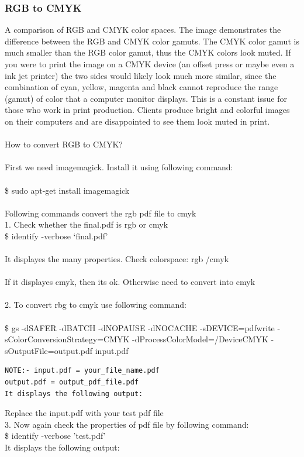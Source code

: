\subsubsection{RGB to CMYK}
\hspace{-1.8em} A comparison of RGB and CMYK color spaces. The image demonstrates the difference between the RGB and CMYK color gamuts. The CMYK color gamut is much smaller than the RGB color gamut, thus the CMYK colors look muted. If you were to print the image on a CMYK device (an offset press or maybe even a ink jet printer) the two sides would likely look much more similar, since the combination of cyan, yellow, magenta and black cannot reproduce the range (gamut) of color that a computer monitor displays. This is a constant issue for those who work in print production. Clients produce bright and colorful images on their computers and are disappointed to see them look muted in print.\\\\
How to convert RGB to CMYK?\\\\
First we need imagemagick. Install it using following command:\\\\
\$ sudo apt-get install imagemagick\\\\
Following commands convert the rgb pdf file  to cmyk\\
1. Check whether the final.pdf is rgb or cmyk\\
\$ identify -verbose ‘final.pdf’\\\\
It displayes the many properties. Check colorspace: rgb /cmyk\\
\\
If it displayes cmyk, then its ok. Otherwise need to convert into cmyk\\\\
2. To convert rbg to cmyk use following command:\\\\
\$ gs -dSAFER -dBATCH -dNOPAUSE -dNOCACHE -sDEVICE=pdfwrite -sColorConversionStrategy=CMYK -dProcessColorModel=/DeviceCMYK -sOutputFile=output.pdf input.pdf\\
\begin{verbatim}
NOTE:- input.pdf = your_file_name.pdf
output.pdf = output_pdf_file.pdf
It displays the following output:
\end{verbatim}
Replace the input.pdf with your test pdf file\\
3. Now again check the properties of pdf file by following command:\\
\$ identify -verbose 'test.pdf'\\
It displays the following output:\\
\\

